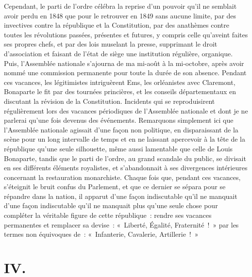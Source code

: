 \documentclass[french,twoside]{book} %
\newcommand\chapteropen{} %
\newcommand\chapterclose{} %
\begin{document}
Cependant, le parti de l’ordre célébra la reprise d’un pouvoir qu’il ne semblait avoir perdu en 1848 que pour le retrouver en 1849 sans aucune limite, par des invectives contre la république et la Constitution, par des anathèmes contre toutes les révolutions passées, présentes et futures, y compris celle qu’aveint faites ses propres chefs, et par des lois muselant la presse, supprimant le droit d’association et faisant de l’état de siège une institution régulière, organique. Puis, l’Assemblée nationale s’ajourna de ma mi-août à la mi-octobre, après avoir nommé une commission permanente pour toute la durée de son absence. Pendant ces vacances, les légitimistes intriguèrent Ems, les orléanistes avec Claremont, Bonaparte le fit par des tournées princières, et les conseils départementaux en discutant la révision de la Constitution. Incidents qui se reproduisirent régulièrement lors des vacances périodiques de l’Assemblée nationale et dont je ne parlerai qu’une fois devenus des événements. Remarquons simplement ici que l’Assemblée nationale agissait d’une façon non politique, en disparaissant de la scène pour un long intervalle de temps et en ne laissant apercevoir à la tête de la république qu’une seule silhouette, même aussi lamentable que celle de Louis Bonaparte, tandis que le parti de l’ordre, au grand scandale du public, se divisait en ses différents éléments royalistes, et s’abandonnait à ses divergences intérieures concernant la restauration monarchiste. Chaque fois que, pendant ces vacances, s’éteignit le bruit confus du Parlement, et que ce dernier se sépara pour se répandre dans la nation, il apparut d’une façon indiscutable qu’il ne manquait d’une façon indiscutable qu’il ne manquait plus qu’une seule chose pour compléter la véritable figure de cette république : rendre ses vacances permanentes et remplacer sa devise : « Liberté, Égalité, Fraternité ! » par les termes non équivoques de : « Infanterie, Cavalerie, Artillerie ! »
\chapterclose


\chapteropen
\chapter[IV.]{IV.}\renewcommand{\leftmark}{IV.}
\end{document}
